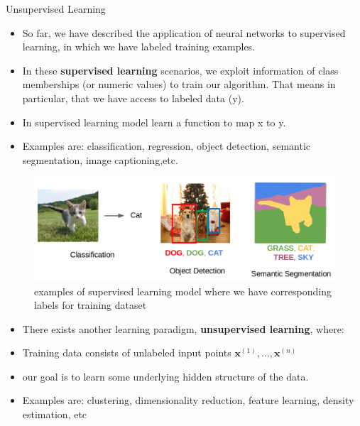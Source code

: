 
 








\begin{vbframe}{Unsupervised Learning}
  \begin{itemize}
    \item So far, we have described the application of neural networks to supervised learning, in which we have labeled training examples.
    \item In these \textbf{supervised learning} scenarios, we exploit information of class memberships (or numeric values) to train our algorithm. That means in particular, that we have access to labeled data (y).
    \item In supervised learning model learn a function to map x to y.
    \item Examples are: classification, regression, object detection, semantic segmentation, image captioning,etc.
  \end{itemize}
    
        \begin{figure}
            \centering
            \includegraphics[width=0.5\linewidth]{plots/supervised.png}
            \caption{examples of supervised learning model where we have corresponding labels for training dataset}
        \end{figure}
    
    \framebreak
    
    \begin{itemize}
      \item There exists another learning paradigm, \textbf{unsupervised learning}, where:
      \item Training data consists of unlabeled input points $\pmb{x}^{(1)}, \dots, \pmb{x}^{(n)}$
      \item our goal is to learn some underlying  hidden structure of the data.
      \item Examples are: clustering, dimensionality reduction, feature learning, density estimation, etc
    \end{itemize}

\end{vbframe}

